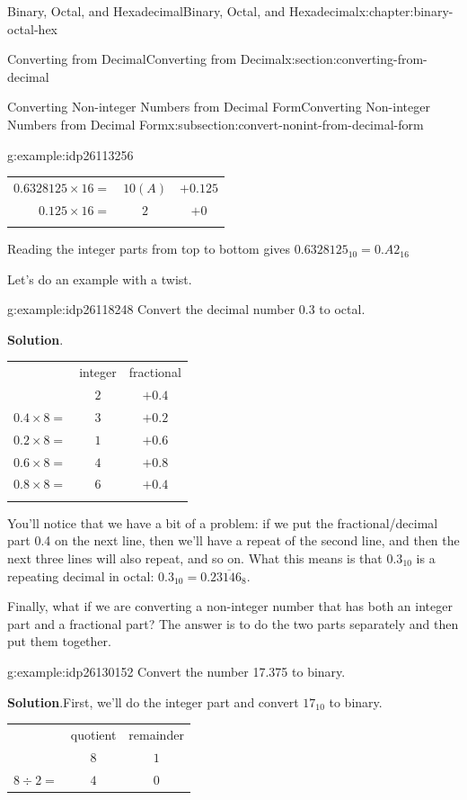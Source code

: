 \documentclass[twoside,10pt,]{book}
\newcommand{\blocktitlefont}{\relax}
\newcommand{\tabularfont}{\relax}
\numberwithin{equation}{section}
\newcommand{\hrulemedium}{\noalign{\hrule height 0.07em}}
\newcommand{\hrulethick} {\noalign{\hrule height 0.11em}}
\begin{document}
\begin{chapterptx}{Binary, Octal, and Hexadecimal}{}{Binary, Octal, and Hexadecimal}{}{}{x:chapter:binary-octal-hex}
\begin{sectionptx}{Converting from Decimal}{}{Converting from Decimal}{}{}{x:section:converting-from-decimal}
\begin{subsectionptx}{Converting Non-integer Numbers from Decimal Form}{}{Converting Non-integer Numbers from Decimal Form}{}{}{x:subsection:convert-nonint-from-decimal-form}
\begin{example}{}{g:example:idp26113256}
\begin{center}
{\begin{tabular}{ccc}
\multicolumn{1}{r}{\(0.6328125\times 16=\)}&\(10 (A)\)&\(+0.125\)\tabularnewline[0pt]
\multicolumn{1}{r}{\(0.125\times 16=\)}&\(2\)&\(+0\)\tabularnewline\hrulethick
\end{tabular}
}%
\end{center}%
 Reading the integer parts from top to bottom gives \(0.6328125_{10}=0.A2_{16}\)\end{example}
Let's do an example with a twist.%
\begin{example}{}{g:example:idp26118248}%
Convert the decimal number 0.3 to octal.\par\smallskip%
\noindent\textbf{\blocktitlefont Solution}.\label{g:solution:idp26116072}{}\hypertarget{g:solution:idp26116072}{}\quad{}\begin{center}%
{\tabularfont%
\begin{tabular}{ccc}\hrulethick
&integer&fractional\tabularnewline\hrulemedium
\multicolumn{1}{r}{\(0.3\times 8=\)}&\(2\)&\(+0.4\)\tabularnewline[0pt]
\multicolumn{1}{r}{\(0.4\times 8=\)}&\(3\)&\(+0.2\)\tabularnewline[0pt]
\multicolumn{1}{r}{\(0.2\times 8=\)}&\(1\)&\(+0.6\)\tabularnewline[0pt]
\multicolumn{1}{r}{\(0.6\times 8=\)}&\(4\)&\(+0.8\)\tabularnewline[0pt]
\multicolumn{1}{r}{\(0.8\times 8=\)}&\(6\)&\(+0.4\)\tabularnewline\hrulethick
\end{tabular}
}%
\end{center}%
You'll notice that we have a bit of a problem:  if we put the fractional\slash{}decimal part 0.4 on the next line, then we'll have a repeat of the second line, and then the next three lines will also repeat, and so on.  What this means is that \(0.3_{10}\) is a repeating decimal in octal: \(0.3_{10}=0.2\overline{3146}_8\).%
\end{example}
Finally, what if we are converting a non-integer number that has both an integer part and a fractional part?  The answer is to do the two parts separately and then put them together.%
\begin{example}{}{g:example:idp26130152}%
Convert the number 17.375 to binary.\par\smallskip%
\noindent\textbf{\blocktitlefont Solution}.\label{g:solution:idp26130280}{}\hypertarget{g:solution:idp26130280}{}\quad{}First, we'll do the integer part and convert \(17_{10}\) to binary. \begin{center}%
{\tabularfont%
\begin{tabular}{ccc}\hrulethick
&quotient&remainder\tabularnewline\hrulemedium
\multicolumn{1}{r}{\(17\div 2=\)}&\(8\)&\(1\)\tabularnewline[0pt]
\multicolumn{1}{r}{\(8\div 2=\)}&\(4\)&\(0\)\tabularnewline[0pt]

\end{tabular}}
\end{center}
\end{example}
\end{subsectionptx}
\end{sectionptx}
\end{chapterptx}
\end{document}
